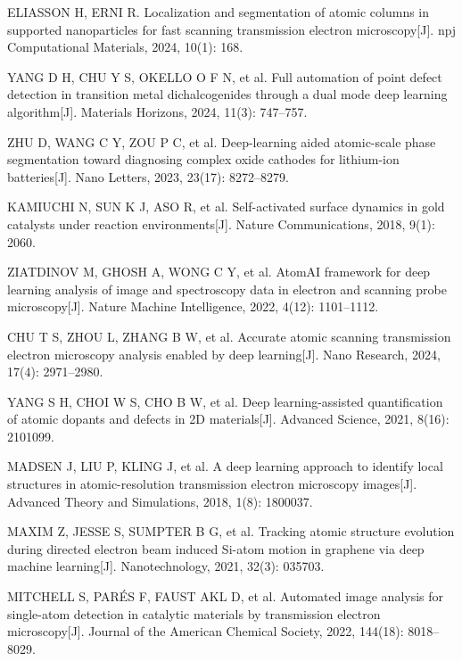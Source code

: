 ELIASSON H, ERNI R. Localization and segmentation of atomic columns in supported nanoparticles for fast scanning transmission electron microscopy[J]. npj Computational Materials, 2024, 10(1): 168.

YANG D H, CHU Y S, OKELLO O F N, et al. Full automation of point defect detection in transition metal dichalcogenides through a dual mode deep learning algorithm[J]. Materials Horizons, 2024, 11(3): 747--757.

ZHU D, WANG C Y, ZOU P C, et al. Deep-learning aided atomic-scale phase segmentation toward diagnosing complex oxide cathodes for lithium-ion batteries[J]. Nano Letters, 2023, 23(17): 8272--8279.

KAMIUCHI N, SUN K J, ASO R, et al. Self-activated surface dynamics in gold catalysts under reaction environments[J]. Nature Communications, 2018, 9(1): 2060.

ZIATDINOV M, GHOSH A, WONG C Y, et al. AtomAI framework for deep learning analysis of image and spectroscopy data in electron and scanning probe microscopy[J]. Nature Machine Intelligence, 2022, 4(12): 1101--1112.

CHU T S, ZHOU L, ZHANG B W, et al. Accurate atomic scanning transmission electron microscopy analysis enabled by deep learning[J]. Nano Research, 2024, 17(4): 2971--2980.

YANG S H, CHOI W S, CHO B W, et al. Deep learning-assisted quantification of atomic dopants and defects in 2D materials[J]. Advanced Science, 2021, 8(16): 2101099.

MADSEN J, LIU P, KLING J, et al. A deep learning approach to identify local structures in atomic-resolution transmission electron microscopy images[J]. Advanced Theory and Simulations, 2018, 1(8): 1800037.

MAXIM Z, JESSE S, SUMPTER B G, et al. Tracking atomic structure evolution during directed electron beam induced Si-atom motion in graphene via deep machine learning[J]. Nanotechnology, 2021, 32(3): 035703.

MITCHELL S, PARÉS F, FAUST AKL D, et al. Automated image analysis for single-atom detection in catalytic materials by transmission electron microscopy[J]. Journal of the American Chemical Society, 2022, 144(18): 8018--8029.


